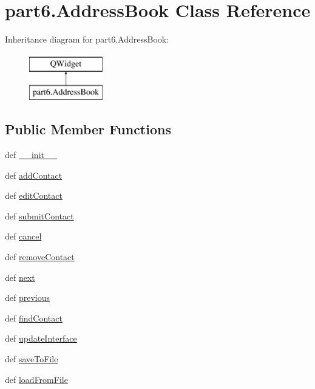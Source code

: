 \hypertarget{classpart6_1_1AddressBook}{}\section{part6.\+Address\+Book Class Reference}
\label{classpart6_1_1AddressBook}
Inheritance diagram for part6.\+Address\+Book\+:\begin{figure}[H]
\begin{center}
\leavevmode
\includegraphics[height=2.000000cm]{classpart6_1_1AddressBook}
\end{center}
\end{figure}
\subsection*{Public Member Functions}
\begin{DoxyCompactItemize}
\item 
def \hyperlink{classpart6_1_1AddressBook_a8ac5107cc6f67ebc3f6f722667297985}{\+\_\+\+\_\+init\+\_\+\+\_\+}
\item 
def \hyperlink{classpart6_1_1AddressBook_a9f684827c272f1b2eba014eaf2519113}{add\+Contact}
\item 
def \hyperlink{classpart6_1_1AddressBook_a1ba74deb70264e6bbd69df16417eff86}{edit\+Contact}
\item 
def \hyperlink{classpart6_1_1AddressBook_a9f769227b1d70d49a1678932518e0a7f}{submit\+Contact}
\item 
def \hyperlink{classpart6_1_1AddressBook_a85633bf1912b2d96fcbe561ad6355577}{cancel}
\item 
def \hyperlink{classpart6_1_1AddressBook_ac861aa3ec75da41e17accd46d8267ddc}{remove\+Contact}
\item 
def \hyperlink{classpart6_1_1AddressBook_acb9a9a28375c51593f88bd7e3b52c418}{next}
\item 
def \hyperlink{classpart6_1_1AddressBook_a73f9793b93b289ba4f67f9982b5eed1c}{previous}
\item 
def \hyperlink{classpart6_1_1AddressBook_ac48508381ce2a3819a7aa980910ae583}{find\+Contact}
\item 
def \hyperlink{classpart6_1_1AddressBook_ab7549fe4857347fb789cceaf03b640f0}{update\+Interface}
\item 
def \hyperlink{classpart6_1_1AddressBook_add7cf8ebecab44057086bd12bcc9d310}{save\+To\+File}
\item 
def \hyperlink{classpart6_1_1AddressBook_a52ccbcdbb84c3f4abcfbcd4d95cefe2b}{load\+From\+File}
\end{DoxyCompactItemize}
